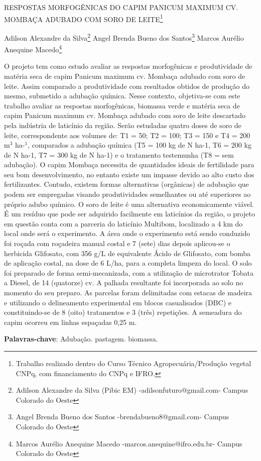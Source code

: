\documentclass[article,12pt,onesidea,4paper,english,brazil]{abntex2}
\begin{document}
	
	
	\frenchspacing 
	
	\begin{center}
		\LARGE RESPOSTAS MORFOGÊNICAS DO CAPIM PANICUM MAXIMUM CV. MOMBAÇA
		ADUBADO COM SORO DE LEITE\footnote{Trabalho realizado dentro do Curso Técnico Agropecuária/Produção vegetal CNPq, com
			financiamento do CNPq e IFRO.}
		
		\normalsize
		Adilson Alexandre da Silva\footnote{Adilson Alexandre da Silva (Pibic EM) -adilsonfuturo@gmail.com- Campus Colorado do Oeste} 
		Angel Brenda Bueno dos Santos\footnote{Angel Brenda Bueno dos Santos -brendabueno8@gmail.com- Campus Colorado do Oeste} 
	Marcos Aurélio Anequine Macedo\footnote{Marcos Aurélio Anequine Macedo -marcos.anequine@ifro.edu.br- Campus Colorado do Oeste} 
	\end{center}
	
	\noindent  O projeto tem como estudo avaliar as respostas morfogênicas e produtividade de matéria
	seca de capim Panicum maximum cv. Mombaça adubado com soro de leite. Assim comparado a
	produtividade com resultados obtidos de produção do mesmo, submetido a adubação química. Nesse
	contexto, objetiva-se com este trabalho avaliar as respostas morfogênicas, biomassa verde e matéria
	seca de capim Panicum maximum cv. Mombaça adubado com soro de leite descartado pela indústria
	de laticínio da região. Serão estudadas quatro doses de soro de leite, correspondente aos volumes
	de: T1 = 50; T2 = 100; T3 = 150 e T4 = 200 m$^3$ ha-$^1$, comparados a adubação química (T5 = 100 kg
	de N ha-1, T6 = 200 kg de N ha-1, T7 = 300 kg de N ha-1) e o tratamento testemunha (T8 = sem
	adubação).
	O capim Mombaça necessita de quantidades ideais de fertilidade para seu bom
	desenvolvimento, no entanto existe um impasse devido ao alto custo dos fertilizantes. Contudo,
	existem formas alternativas (orgânicas) de adubação que podem ser empregadas visando
	produtividades semelhantes ou até superiores ao próprio adubo químico. O soro de leite é uma
	alternativa economicamente viável. É um resíduo que pode ser adquirido facilmente em laticínios da
	região, o projeto em questão conta com a parceria do laticínio Multibom, localizado a 4 km do local
	onde será o experimento.
	A área onde o experimento está sendo conduzido foi roçada com roçadeira manual costal e 7
	(sete) dias depois aplicou-se o herbicida Glifosato, com 356 g/L de equivalente Ácido de Glifosato,
	com bomba de aplicação costal, na dose de 6 L/ha, para a completa limpeza do local. O solo foi
	preparado de forma semi-mecanizada, com a utilização de microtrator Tobata a Diesel, de 14
	(quatorze) cv. A palhada resultante foi incorporada ao solo no momento do seu preparo. As parcelas
	foram delimitadas com estacas de madeira e utilizando o delineamento experimental em blocos
	casualisados (DBC) e constituindo-se de 8 (oito) tratamentos e 3 (três) repetições. A semeadura do
	capim ocorreu em linhas espaçadas 0,25 m.
	\vspace{\onelineskip}
	
	\noindent
	\textbf{Palavras-chave}: Adubação. pastagem. biomassa.
	
\end{document}
